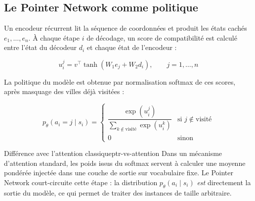 \documentclass[12pt, a4paper, twoside, openright]{book}
\begin{document}
\subsection{Le Pointer Network comme politique}
\label{sec:ch4-ptrnet}

Un encodeur récurrent lit la séquence de coordonnées et produit les états
cachés $e_1, \dots, e_n$. À chaque étape $i$ de décodage, un score de
compatibilité est calculé entre l'état du décodeur $d_i$ et chaque état de
l'encodeur :

\begin{equation}
	u_i^j = v^\top \tanh(W_1 e_j + W_2 d_i), \qquad j = 1, \dots, n
	\label{eq:ptr-score}
\end{equation}

La politique du modèle est obtenue par normalisation softmax de ces scores,
après masquage des villes déjà visitées :

\begin{equation}
	p_\theta(a_i = j \mid s_i) =
	\begin{cases}
		\dfrac{\exp(u_i^j)}{\sum_{k \notin \text{visité}} \exp(u_i^k)} & \text{si } j \notin \text{visité} \\[6pt]
		0 & \text{sinon}
	\end{cases}
	\label{eq:ptr-softmax}
\end{equation}

\begin{remark}{Différence avec l'attention classique}{ptr-vs-attention}
	Dans un mécanisme d'attention standard, les poids issus du softmax servent à
	calculer une moyenne pondérée injectée dans une couche de sortie sur
	vocabulaire fixe. Le Pointer Network court-circuite cette étape : la
	distribution $p_\theta(a_i \mid s_i)$ \emph{est} directement la sortie du
	modèle, ce qui permet de traiter des instances de taille arbitraire.
\end{remark}
\end{document}
